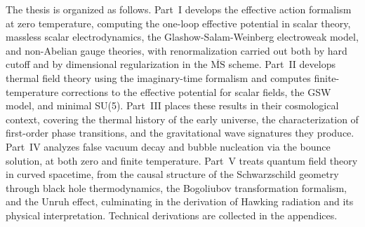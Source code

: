 The thesis is organized as follows. Part~I develops the effective
action formalism at zero temperature, computing the one-loop effective
potential in scalar theory, massless scalar electrodynamics, the
Glashow-Salam-Weinberg electroweak model, and non-Abelian gauge
theories, with renormalization carried out both by hard cutoff and by
dimensional regularization in the $\overline{\text{MS}}$ scheme.
Part~II develops thermal field theory using the imaginary-time
formalism and computes finite-temperature corrections to the effective
potential for scalar fields, the GSW model, and minimal SU(5).
Part~III places these results in their cosmological context, covering
the thermal history of the early universe, the characterization of
first-order phase transitions, and the gravitational wave signatures
they produce. Part~IV analyzes false vacuum decay and bubble
nucleation via the bounce solution, at both zero and finite
temperature. Part~V treats quantum field theory in curved spacetime,
from the causal structure of the Schwarzschild geometry through black
hole thermodynamics, the Bogoliubov transformation formalism, and the
Unruh effect, culminating in the derivation of Hawking radiation and
its physical interpretation. Technical derivations are collected in
the appendices.
